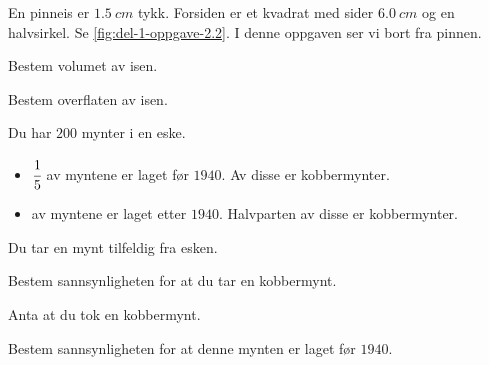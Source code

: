 En pinneis er $\SI{1.5}{cm}$ tykk. Forsiden er et kvadrat med sider
$\SI{6.0}{cm}$ og en halvsirkel.
Se \cref{fig:del-1-oppgave-2.2}. I denne oppgaven ser vi bort fra pinnen.

\begin{oppgaver}
     Bestem volumet av isen.
\end{oppgaver}

\begin{oppgaver}
     Bestem overflaten av isen.
\end{oppgaver}


\Oppgave[4] %

Du har $200$ mynter i en eske.

\begin{itemize}
    \item $\cfrac{1}{5}$ av myntene er laget før $1940$. Av disse er
      kobbermynter.
    \item av myntene er laget etter $1940$. Halvparten av disse er kobbermynter.
\end{itemize}

Du tar en mynt tilfeldig fra esken.

\begin{oppgaver}
     Bestem sannsynligheten for at du tar en kobbermynt.
\end{oppgaver}

Anta at du tok en kobbermynt.

\begin{oppgaver}
     Bestem sannsynligheten for at denne mynten er laget før $1940$.
\end{oppgaver}


\Oppgave[4] %

